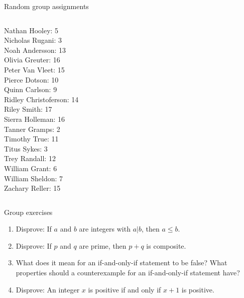 \documentclass[10pt]{beamer}
\begin{document}
\begin{frame}{Random group assignments}
\begin{columns}
\begin{column}{0.33\textwidth}
Nathan Hooley: 5 \\ 
Nicholas Rugani: 3 \\ 
Noah Andersson: 13 \\ 
Olivia Greuter: 16 \\ 
Peter Van Vleet: 15 \\ 
Pierce Dotson: 10 \\ 
Quinn Carlson: 9 \\ 
Ridley Christoferson: 14 \\ 
Riley Smith: 17 \\ 
Sierra Holleman: 16 \\ 
Tanner Gramps: 2 \\ 
Timothy True: 11 \\ 
Titus Sykes: 3 \\ 
Trey Randall: 12 \\ 
William Grant: 6 \\ 
William Sheldon: 7 \\ 
Zachary Reller: 15 \\\end{column}
\end{columns}
\end{frame}


\begin{frame}{Group exercises}
\begin{enumerate}
	\item Disprove: If $a$ and $b$ are integers with $a|b$, then $a \leq b$.
	\item Disprove: If $p$ and $q$ are prime, then $p+q$ is composite.
	\item What does it mean for an if-and-only-if statement to be false? What properties should a counterexample for an if-and-only-if statement have?
	\item Disprove: An integer $x$ is positive if and only if $x+1$ is positive.
\end{enumerate}


\end{frame}
\end{document}
